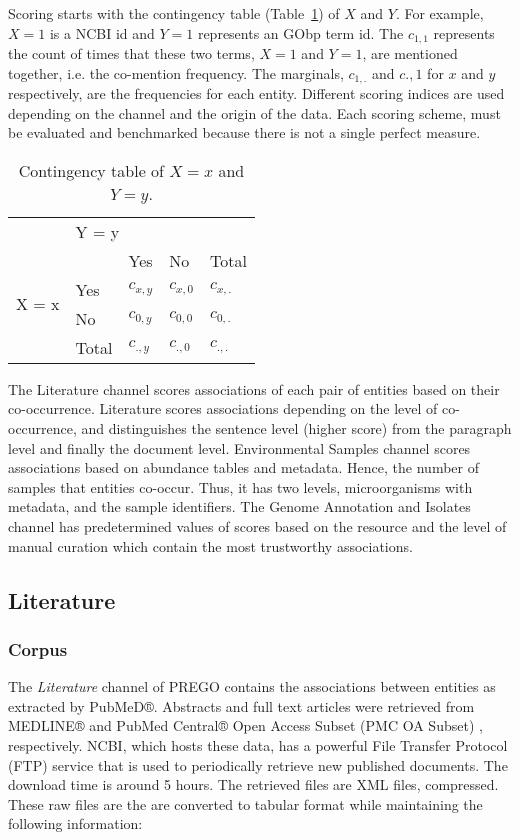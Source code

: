 Scoring starts with the contingency table (Table~\ref{table:pregoA1}) of $X$ and $Y$.
For example, $X = 1$ is a NCBI id and $Y = 1$ represents an GObp term id. 
The $c_{1,1}$ represents the count of times that these two terms, $X = 1$ and $Y = 1$, 
are mentioned together, i.e. the co-mention frequency. 
The marginals, $c_{1,.}$ and $c{.,1}$ for $x$ and $y$ respectively,
are the frequencies for each entity. 
Different scoring indices are used depending on the channel and the origin of the data.
Each scoring scheme, must be evaluated and benchmarked because there is not a 
single perfect measure. 

\begin{table}[ht]
   \centering
   \begin{tabular}{c|llll}
    & \multicolumn{4}{l}{Y = y} \\ \cline{2-5} 
   \multirow{4}{*}{X = x} &  & Yes & No & Total \\ \cline{3-5} 
    & \multicolumn{1}{l|}{Yes} & $c_{x,y}$ & $c_{x,0}$ & $c_{x,.}$ \\
    & \multicolumn{1}{l|}{No} & $c_{0,y}$ & $c_{0,0}$ & $c_{0,.}$ \\
    & \multicolumn{1}{l|}{Total} & $c_{.,y}$ & $c_{.,0}$ & $c_{.,.}$
   \end{tabular}
   \caption[PREGO contingency table between two terms]{Contingency table of $X = x$ and $Y = y$.}
   \label{table:pregoA1}
\end{table}

The Literature channel scores associations of each pair of entities based on their co-occurrence. 
Literature scores associations depending on the level of co-occurrence, and distinguishes
the sentence level (higher score) from the paragraph level and finally the document level.
Environmental Samples channel scores associations based on abundance tables and metadata. Hence, the number of samples that entities co-occur. 
Thus, it has two levels, microorganisms with metadata, and the sample identifiers.
The Genome Annotation and Isolates channel has predetermined values of scores
based on the resource and the level of manual curation which contain the most trustworthy associations. 

   \subsection{Literature}
   \label{subsec:prego-tm}

   \subsubsection{Corpus}
The \textit{Literature} channel of PREGO contains the associations between 
entities as extracted by PubMeD®. Abstracts and full text articles were retrieved
from MEDLINE® and PubMed Central® Open Access Subset (PMC OA Subset) \parencite{sayers2021database}, respectively. 
NCBI, which hosts these data, has a powerful File Transfer Protocol (FTP) service 
that is used to periodically retrieve new published documents. The download time 
is around 5 hours.
The retrieved files are XML files, compressed. These raw files are the are converted
to tabular format while maintaining the following information:

